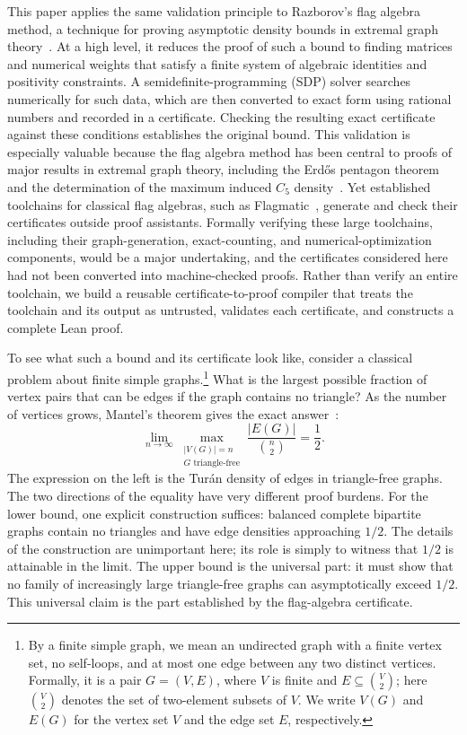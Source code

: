 \documentclass[acmsmall,screen=true,acmthm=false]{acmart}
\newcommand{\boldparagraph}[1]{\noindentparagraph{\textnormal{\textbf{#1}}}}
\begin{document}
This paper applies the same validation principle to Razborov's flag algebra
method, a technique for proving asymptotic density bounds in extremal graph
theory~\cite{razborov2007flag}.  At a high level, it reduces the proof of such a
bound to finding matrices and numerical weights that satisfy a finite system of
algebraic identities and positivity constraints.  A
semidefinite-programming (SDP) solver searches numerically for
such data, which are then converted to exact form using rational numbers and
recorded in a certificate.  Checking the resulting exact certificate against
these conditions establishes the original bound.  This validation is especially
valuable because the flag algebra method has been central to proofs of major
results in extremal graph theory, including the Erd\H{o}s
pentagon theorem and the determination of the maximum induced $C_5$
density~\cite{hatami2012,grzesik2012,balogh2016induced5}.  Yet established
toolchains for classical flag algebras, such as
Flagmatic~\cite{vaughan2013flagmatic}, generate and check their certificates
outside proof assistants.  Formally verifying these large toolchains, including
their graph-generation, exact-counting, and numerical-optimization components,
would be a major undertaking, and the certificates considered here had not
been converted into machine-checked proofs.  Rather than verify an entire
toolchain, we build a reusable certificate-to-proof compiler that treats the
toolchain and its output as untrusted, validates each certificate, and
constructs a complete Lean proof.

\boldparagraph{Flag algebras and their certificates.}
To see what such a bound and its certificate look like, consider a classical
problem about finite simple graphs.\footnote{By a finite simple graph, we mean
an undirected graph with a finite vertex set, no self-loops, and at most one
edge between any two distinct vertices.  Formally, it is a pair $G=(V,E)$,
where $V$ is finite and $E\subseteq\binom{V}{2}$; here $\binom{V}{2}$ denotes
the set of two-element subsets of $V$.  We write $V(G)$ and $E(G)$ for the
vertex set $V$ and the edge set $E$, respectively.}  What is the largest
possible fraction of vertex pairs that can be edges if the graph contains no
triangle?  As the number of vertices grows, Mantel's theorem gives the exact
answer~\cite{mantel}:
\[
  \lim_{n\to\infty}
  \max_{\substack{|V(G)|=n\\G\text{ triangle-free}}}
  \frac{|E(G)|}{\binom{n}{2}}
  = \frac{1}{2}.
\]
The expression on the left is the Tur\'an density of edges in triangle-free
graphs.  The two directions of the equality have very different proof burdens.
For the lower bound, one explicit construction suffices: balanced complete
bipartite graphs contain no triangles and have edge densities approaching
$1/2$.  The details of the construction are unimportant here; its role is
simply to witness that $1/2$ is attainable in the limit.  The upper bound is
the universal part: it must show that no family of increasingly large
triangle-free graphs can asymptotically exceed $1/2$.  This universal claim is
the part established by the flag-algebra certificate.
\end{document}
